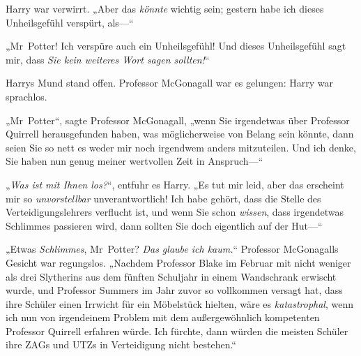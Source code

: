 Harry war verwirrt. „Aber das \emph{könnte} wichtig sein; gestern habe ich dieses Unheilsgefühl verspürt, als—“

„Mr~Potter! Ich verspüre auch ein Unheilsgefühl! Und dieses Unheilsgefühl sagt mir, dass \emph{Sie kein weiteres Wort sagen sollten!}“

Harrys Mund stand offen. Professor McGonagall war es gelungen: Harry war sprachlos.

„Mr~Potter“, sagte Professor McGonagall, „wenn Sie irgendetwas über Professor Quirrell herausgefunden haben, was möglicherweise von Belang sein könnte, dann seien Sie so nett es weder mir noch irgendwem anders mitzuteilen. Und ich denke, Sie haben nun genug meiner wertvollen Zeit in Anspruch—“

„\emph{Was ist mit Ihnen los?}“, entfuhr es Harry. „Es tut mir leid, aber das erscheint mir so \emph{unvorstellbar} unverantwortlich! Ich habe gehört, dass die Stelle des Verteidigungslehrers verflucht ist, und wenn Sie schon \emph{wissen}, dass irgendetwas Schlimmes passieren wird, dann sollten Sie doch eigentlich auf der Hut—“

„Etwas \emph{Schlimmes}, Mr~Potter? \emph{Das glaube ich kaum.}“ Professor McGonagalls Gesicht war regungslos. „Nachdem Professor Blake im Februar mit nicht weniger als drei Slytherins aus dem fünften Schuljahr in einem Wandschrank erwischt wurde, und Professor Summers im Jahr zuvor so vollkommen versagt hat, dass ihre Schüler einen Irrwicht für ein Möbelstück hielten, wäre es \emph{katastrophal}, wenn ich nun von irgendeinem Problem mit dem außergewöhnlich kompetenten Professor Quirrell erfahren würde. Ich fürchte, dann würden die meisten Schüler ihre ZAGs und UTZs in Verteidigung nicht bestehen.“

